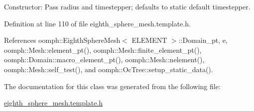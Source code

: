 Constructor\+: Pass radius and timestepper; defaults to static default timestepper. 



Definition at line 110 of file eighth\+\_\+sphere\+\_\+mesh.\+template.\+h.



References oomph\+::\+Eighth\+Sphere\+Mesh$<$ E\+L\+E\+M\+E\+N\+T $>$\+::\+Domain\+\_\+pt, e, oomph\+::\+Mesh\+::element\+\_\+pt(), oomph\+::\+Mesh\+::finite\+\_\+element\+\_\+pt(), oomph\+::\+Domain\+::macro\+\_\+element\+\_\+pt(), oomph\+::\+Mesh\+::nelement(), oomph\+::\+Mesh\+::self\+\_\+test(), and oomph\+::\+Oc\+Tree\+::setup\+\_\+static\+\_\+data().



The documentation for this class was generated from the following file\+:\begin{DoxyCompactItemize}
\item 
\hyperlink{eighth__sphere__mesh_8template_8h}{eighth\+\_\+sphere\+\_\+mesh.\+template.\+h}\end{DoxyCompactItemize}
